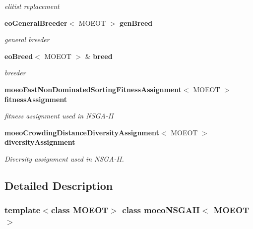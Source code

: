 \begin{CompactItemize}
\begin{CompactList}\small\item\em elitist replacement \item\end{CompactList}\item 
{\bf eo\-General\-Breeder}$<$ MOEOT $>$ {\bf gen\-Breed}\label{classmoeoNSGAII_2099c3069a7da12485578fc66ff71ff1}

\begin{CompactList}\small\item\em general breeder \item\end{CompactList}\item 
{\bf eo\-Breed}$<$ MOEOT $>$ \& {\bf breed}\label{classmoeoNSGAII_17954849435e579d74bf37ed7b9063fc}

\begin{CompactList}\small\item\em breeder \item\end{CompactList}\item 
{\bf moeo\-Fast\-Non\-Dominated\-Sorting\-Fitness\-Assignment}$<$ MOEOT $>$ {\bf fitness\-Assignment}\label{classmoeoNSGAII_2cf7c853cc4213664b0654b1e5a8862a}

\begin{CompactList}\small\item\em fitness assignment used in NSGA-II \item\end{CompactList}\item 
{\bf moeo\-Crowding\-Distance\-Diversity\-Assignment}$<$ MOEOT $>$ {\bf diversity\-Assignment}\label{classmoeoNSGAII_c23794a3b8f5d4845b1153e1fa03dc8c}

\begin{CompactList}\small\item\em Diversity assignment used in NSGA-II. \item\end{CompactList}\end{CompactItemize}


\subsection{Detailed Description}
\subsubsection*{template$<$class MOEOT$>$ class moeo\-NSGAII$<$ MOEOT $>$}

